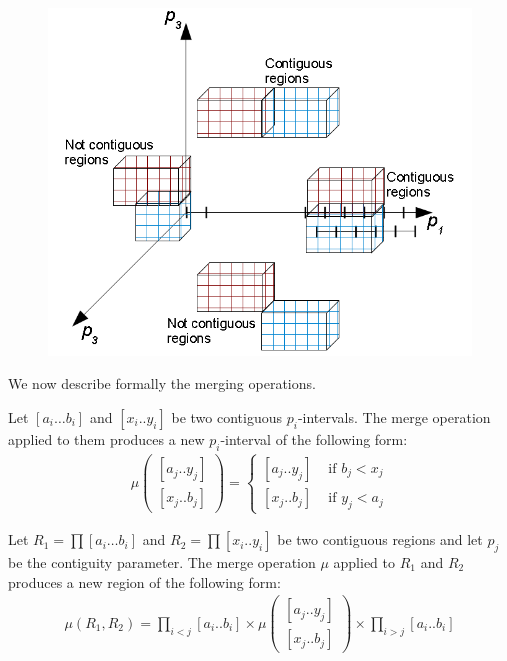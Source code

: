 	\begin{figure}[t]
		\center
		\includegraphics[width=0.8\columnwidth]{img/contiguous_regions}
	\end{figure}

We now describe formally the merging operations.
\begin{definition}
Let $\left[a_{i}\dots b_{i}\right]$ and $\left[x_{i}..y_{i}\right]$ be two contiguous $p_i$-intervals. The merge operation applied to them produces a new $p_i$-interval of the following form:
	\begin{align}
		\mu	 \left( \begin{array}{l}
				\left[a_{j}..y_{j}\right] \\
				\left[x_{j}..b_{j}\right]
		     \end{array} \right)
		=\begin{cases}
			\left[a_{j}..y_{j}\right] & \mbox{ if }b_{j}<x_{j}\\
			\left[x_{j}..b_{j}\right] & \mbox{ if }y_{j}<a_{j}
		\end{cases}
	\end{align}

\end{definition}

\begin{definition}
Let $R_{1}=\prod\left[a_{i}\dots b_{i}\right]$ and $R_{2}=\prod\left[x_{i}..y_{i}\right]$ be two contiguous regions and let $p_j$ be the contiguity parameter. 
The merge operation $\mu$ applied to $R_1$ and $R_2$ produces a new region of the following form:
	\begin{align}
		\mu(R_1,R_2)=\prod_{i<j}\left[a_{i}..b_{i}\right]
		\times
		\mu	 \left( \begin{array}{l}
				\left[a_{j}..y_{j}\right] \\
				\left[x_{j}..b_{j}\right]
		     \end{array} \right)
		\times
		\prod_{i>j}\left[a_{i}..b_{i}\right]
	\end{align}
\end{definition}

